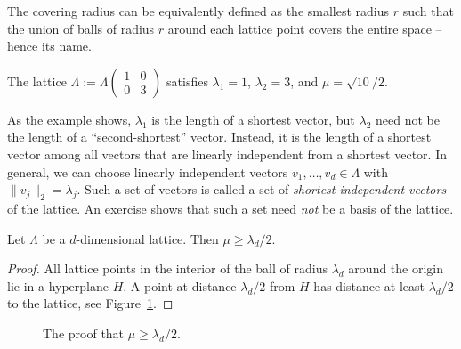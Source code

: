 The covering radius can be equivalently defined as the smallest radius $r$
such that the union of balls of radius $r$ around each lattice point
covers the entire space -- hence its name.

\begin{example}
  \label{example:rect-lattice-minima}
  The lattice $\Lambda := \Lambda \begin{pmatrix} 1 & 0 \\ 0 & 3 \end{pmatrix}$
  satisfies $\lambda_1 = 1$, $\lambda_2 = 3$, and $\mu = \sqrt{10}/2$.
  \begin{center}
  \end{center}
\end{example}

As the example shows,
$\lambda_1$ is the length of a shortest vector,
but $\lambda_2$ need not be the length of a ``second-shortest'' vector.
Instead, it is the length of a shortest vector among all vectors that are
linearly independent from a shortest vector.
In general,
we can choose linearly independent vectors $v_1, \ldots, v_d \in \Lambda$ with $\|v_j\|_2 = \lambda_j$.
Such a set of vectors is called a set of \emph{shortest independent vectors} of the lattice.
An exercise shows that such a set need \emph{not} be a basis of the lattice.

\begin{lemma}
  \label{lemma:mu-lambda-d}
  Let $\Lambda$ be a $d$-dimensional lattice.
  Then $\mu \geq \lambda_d / 2$.
\end{lemma}
\begin{proof}
  All lattice points in the interior of the ball of radius $\lambda_d$ around the origin
  lie in a hyperplane $H$.
  A point at distance $\lambda_d/2$ from $H$ has distance at least $\lambda_d/2$ to the lattice,
  see Figure~\ref{fig:mu-vs-lambda-d}.
\end{proof}
\begin{figure}
  \begin{center}
  \end{center}
  \caption{The proof that $\mu \geq \lambda_d / 2$.}
  \label{fig:mu-vs-lambda-d}
\end{figure}

